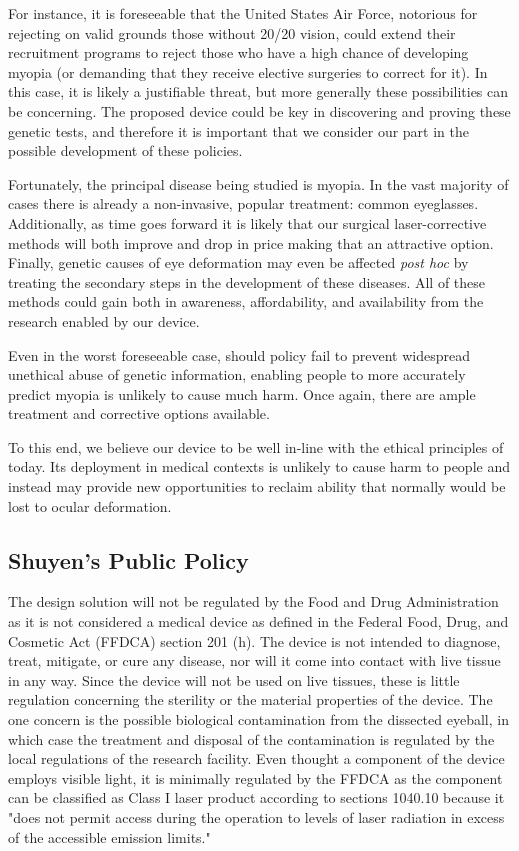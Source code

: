 \documentclass{article}
\begin{document}
For instance, it is foreseeable that the United States Air Force, notorious for
rejecting on valid grounds those without 20/20 vision, could extend
their recruitment programs to reject those who have a high chance of
developing myopia (or demanding that they receive elective surgeries
to correct for it). In this case, it is likely a justifiable threat,
but more generally these possibilities can be concerning. The proposed
device could be key in discovering and proving these genetic tests,
and therefore it is important that we consider our part in the
possible development of these policies.

Fortunately, the principal disease being studied is myopia. In the
vast majority of cases there is already a non-invasive, popular
treatment: common eyeglasses. Additionally, as time goes forward it is
likely that our surgical laser-corrective methods will both improve
and drop in price making that an attractive option. Finally, genetic
causes of eye deformation may even be affected \textit{post hoc} by
treating the secondary steps in the development of these diseases. All
of these methods could gain both in awareness, affordability, and
availability from the research enabled by our device.

Even in the worst foreseeable case, should policy fail to prevent
widespread unethical abuse of genetic information, enabling people to
more accurately predict myopia is unlikely to cause much harm. Once
again, there are ample treatment and corrective options available.

To this end, we believe our device to be well in-line with the ethical
principles of today. Its deployment in medical contexts is unlikely
to cause harm to people and instead may provide new opportunities to
reclaim ability that normally would be lost to ocular deformation.


	
\subsection{Shuyen's Public Policy}
\label{sec:Public Policy}

The design solution will not be regulated by the Food and Drug Administration as it is
not considered a medical device as defined in the Federal Food, Drug,
and Cosmetic Act (FFDCA) section 201 (h). The device is not intended
to diagnose, treat, mitigate, or cure any disease, nor will it come into
contact with live tissue in any way. Since the device will not be used
on live tissues, these is little regulation concerning the sterility
or the material properties of the device. The one concern is the
possible biological contamination from the dissected eyeball, in which
case the treatment and disposal of the contamination is regulated by
the local regulations of the research facility.  Even thought a
component of the device employs visible light, it is minimally
regulated by the FFDCA as the component can be classified as Class I
laser product according to sections 1040.10 because it "does not
permit access during the operation to levels of laser radiation in
excess of the accessible emission limits."




\newpage
{}


\end{document}
